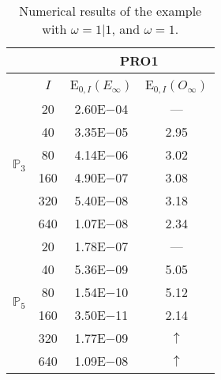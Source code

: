 \begin{table}[H]
\caption{Numerical results of the example with $\omega=1|1$, and $\omega=1$.}
\setlength{\tabcolsep}{5pt}
\centering
\begin{tabular}{@{}l c c c@{}}
\toprule
 &  & \multicolumn{2}{c}{PRO1}\\
\midrule
 & $I$ & E$_{0,I}(E_{\infty})$ & E$_{0,I}(O_{\infty})$\\
\midrule
\multirow{6}{*}{$\mathbb{P}_{3}$}
 & 20 & 2.60E$-$04 & ---\\
 & 40 & 3.35E$-$05 & 2.95\\
 & 80 & 4.14E$-$06 & 3.02\\
 & 160 & 4.90E$-$07 & 3.08\\
 & 320 & 5.40E$-$08 & 3.18\\
 & 640 & 1.07E$-$08 & 2.34\\
\midrule
\multirow{6}{*}{$\mathbb{P}_{5}$}
 & 20 & 1.78E$-$07 & ---\\
 & 40 & 5.36E$-$09 & 5.05\\
 & 80 & 1.54E$-$10 & 5.12\\
 & 160 & 3.50E$-$11 & 2.14\\
 & 320 & 1.77E$-$09 & $\uparrow$\\
 & 640 & 1.09E$-$08 & $\uparrow$\\
\bottomrule
\end{tabular}
\label{Table:PRO:test_01_01_test39_pro1}
\end{table}
